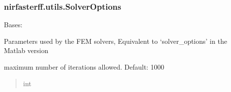 \documentclass[letterpaper,10pt,english]{sphinxmanual}
\begin{document}
\sphinxstepscope


\subsubsection{nirfasterff.utils.SolverOptions}
\label{\detokenize{_autosummary/nirfasterff.utils.SolverOptions:nirfasterff-utils-solveroptions}}\label{\detokenize{_autosummary/nirfasterff.utils.SolverOptions::doc}}

\begin{fulllineitems}
\label{\detokenize{_autosummary/nirfasterff.utils.SolverOptions:nirfasterff.utils.SolverOptions}}
\pysigstartsignatures
\pysiglinewithargsret
{}
{\sphinxparamcomma {}\sphinxparamcomma {}\sphinxparamcomma {}\sphinxparamcomma {}}
{}
\pysigstopsignatures
\sphinxAtStartPar
Bases: 

\sphinxAtStartPar
Parameters used by the FEM solvers, Equivalent to ‘solver\_options’ in the Matlab version

\begin{fulllineitems}
\label{\detokenize{_autosummary/nirfasterff.utils.SolverOptions:nirfasterff.utils.SolverOptions.max_iter}}
\pysigstartsignatures
\pysigline
{}
\pysigstopsignatures
\sphinxAtStartPar
maximum number of iterations allowed. Default: 1000
\begin{quote}\begin{description}
\sphinxAtStartPar
int

\end{description}\end{quote}

\end{fulllineitems}


\end{fulllineitems}
\end{document}
